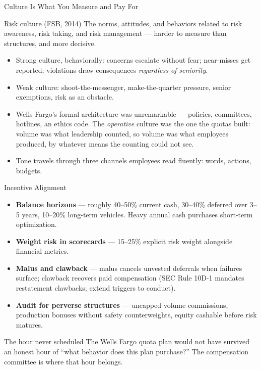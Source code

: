 \documentclass[11pt, aspectratio=169]{beamer}
\begin{document}
\begin{frame}{Culture Is What You Measure and Pay For}
\begin{block}{Risk culture (FSB, 2014)}
The norms, attitudes, and behaviors related to risk awareness, risk taking, and risk management --- harder to measure than structures, and \alert{more decisive}.
\end{block}
\medskip
\begin{itemize}
  \item Strong culture, behaviorally: concerns escalate without fear; near-misses get reported; violations draw consequences \emph{regardless of seniority}.
  \item Weak culture: shoot-the-messenger, make-the-quarter pressure, senior exemptions, risk as an obstacle.
  \item Wells Fargo's formal architecture was unremarkable --- policies, committees, hotlines, an ethics code. The \emph{operative} culture was the one the quotas built: volume was what leadership counted, so volume was what employees produced, by whatever means the counting could not see.
  \item Tone travels through three channels employees read fluently: \alert{words, actions, budgets}.
\end{itemize}
\end{frame}

\begin{frame}{Incentive Alignment}
\begin{itemize}
  \item \textbf{Balance horizons} --- roughly 40--50\% current cash, 30--40\% deferred over 3--5 years, 10--20\% long-term vehicles. Heavy annual cash purchases short-term optimization.
  \item \textbf{Weight risk in scorecards} --- 15--25\% explicit risk weight alongside financial metrics.
  \item \textbf{Malus and clawback} --- \alert{malus} cancels unvested deferrals when failures surface; \alert{clawback} recovers paid compensation (SEC Rule 10D-1 mandates restatement clawbacks; extend triggers to conduct).
  \item \textbf{Audit for perverse structures} --- uncapped volume commissions, production bonuses without safety counterweights, equity cashable before risk matures.
\end{itemize}
\medskip
\begin{block}{The hour never scheduled}
The Wells Fargo quota plan would not have survived an honest hour of ``what behavior does this plan purchase?'' The compensation committee is where that hour belongs.
\end{block}
\end{frame}
\end{document}
